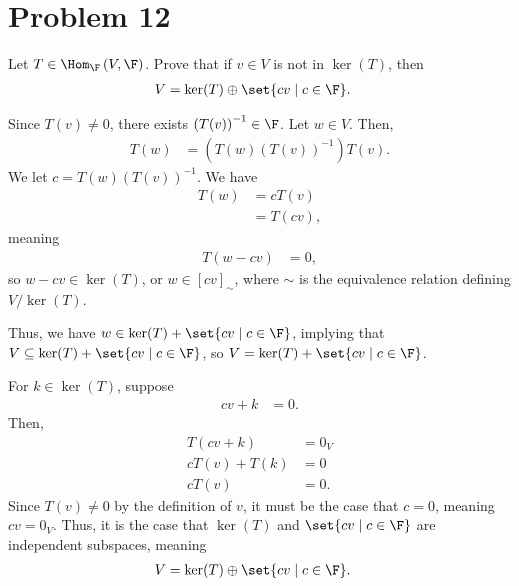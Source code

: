 \documentclass[12pt]{mypackage}
\begin{document}
\section{Problem 12}%
\begin{problem}
  Let $T\in \Hom_{\F}\left(V,\F\right)$. Prove that if $v\in V$ is not in $\ker(T)$, then
  \begin{align*}
    V &= \ker(T) \oplus \set{cv\mid c\in\F}.
  \end{align*}
\end{problem}
\begin{solution}
  Since $T(v)\neq 0$, there exists $\left(T(v)\right)^{-1}\in \F$. Let $w\in V$. Then,
  \begin{align*}
    T(w) &= \left(T(w)\left(T(v)\right)^{-1}\right)T(v).
  \end{align*}
  We let $c = T(w)\left(T(v)\right)^{-1}$. We have
  \begin{align*}
    T(w) &= cT(v)\\
         &= T(cv),
  \end{align*}
  meaning
  \begin{align*}
    T\left(w - cv\right) &= 0,
  \end{align*}
  so $w-cv\in \ker(T)$, or $w\in \left[cv\right]_{\sim}$, where $\sim$ is the equivalence relation defining $V/\ker(T)$.\newline

  Thus, we have $w \in \ker(T) + \set{cv\mid c\in \F}$, implying that $V \subseteq \ker(T) + \set{cv\mid c\in \F}$, so $V = \ker(T) + \set{cv\mid c\in\F}$.\newline

  For $k\in\ker(T)$, suppose
  \begin{align*}
    cv + k &= 0.
  \end{align*}
  Then,
  \begin{align*}
    T\left(cv + k\right) &= 0_V\\
    cT\left(v\right) + T(k) &= 0\\
    cT\left(v\right) &= 0.
  \end{align*}
  Since $T(v)\neq 0$ by the definition of $v$, it must be the case that $c=0$, meaning $cv = 0_V$. Thus, it is the case that $\ker(T)$ and $\set{cv\mid c\in\F}$ are independent subspaces, meaning
  \begin{align*}
    V &= \ker(T)\oplus \set{cv\mid c\in\F}.
  \end{align*}
\end{solution}
\end{document}
